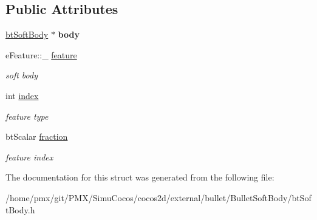 \subsection*{Public Attributes}
\begin{DoxyCompactItemize}
\item 
\mbox{\label{structbtSoftBody_1_1sRayCast_ad1c73060c43d6de8b0b31b9cb3c9296a}} 
\hyperlink{classbtSoftBody}{bt\+Soft\+Body} $\ast$ {\bfseries body}
\item 
\mbox{\label{structbtSoftBody_1_1sRayCast_a41cf3cf2defa637a584159ceb7b42c0e}} 
e\+Feature\+::\+\_\+ \hyperlink{structbtSoftBody_1_1sRayCast_a41cf3cf2defa637a584159ceb7b42c0e}{feature}
\begin{DoxyCompactList}\small\item\em soft body \end{DoxyCompactList}\item 
\mbox{\label{structbtSoftBody_1_1sRayCast_ad0f0741cdacfb4171e226f19368f1b69}} 
int \hyperlink{structbtSoftBody_1_1sRayCast_ad0f0741cdacfb4171e226f19368f1b69}{index}
\begin{DoxyCompactList}\small\item\em feature type \end{DoxyCompactList}\item 
\mbox{\label{structbtSoftBody_1_1sRayCast_ac447ec3fddb58db8beb79c1d7c3ad92b}} 
bt\+Scalar \hyperlink{structbtSoftBody_1_1sRayCast_ac447ec3fddb58db8beb79c1d7c3ad92b}{fraction}
\begin{DoxyCompactList}\small\item\em feature index \end{DoxyCompactList}\end{DoxyCompactItemize}


The documentation for this struct was generated from the following file\+:\begin{DoxyCompactItemize}
\item 
/home/pmx/git/\+P\+M\+X/\+Simu\+Cocos/cocos2d/external/bullet/\+Bullet\+Soft\+Body/bt\+Soft\+Body.\+h\end{DoxyCompactItemize}
